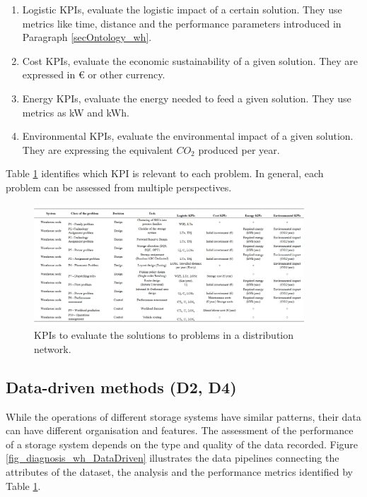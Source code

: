 \begin{enumerate}
    \item Logistic KPIs, evaluate the logistic impact of a certain solution. They use metrics like time, distance and the performance parameters introduced in Paragraph \ref{secOntology_wh}.
	\item Cost KPIs, evaluate the economic sustainability of a given solution. They are expressed in \euro{} or other currency.
	\item Energy KPIs, evaluate the energy needed to feed a given solution. They use metrics as kW and kWh.
	\item Environmental KPIs, evaluate the environmental impact of a given solution. They are expressing the equivalent $CO_2$ produced per year.

\end{enumerate}

Table \ref{tab_kpis} identifies which KPI is relevant to each problem. In general, each problem can be assessed from multiple perspectives.

\begin{figure}[hbt!]
\centering
\includegraphics[width=0.9\textwidth]{SectionWarehouses/control_figures/tab_kpis.png}
\captionsetup{type=table}
\caption{KPIs to evaluate the solutions to problems in a distribution network.}
\label{tab_kpis}
\end{figure}

\subsection{Data-driven methods (D2, D4)} \label{secDataDrivenAnalysisWh}

While the operations of different storage systems have similar patterns, their data can have different organisation and features. The assessment of the performance of a storage system depends on the type and quality of the data recorded. Figure \ref{fig_diagnosis_wh_DataDriven} illustrates the data pipelines connecting the attributes of the dataset, the analysis and the performance metrics identified by Table \ref{tab_kpis}.

